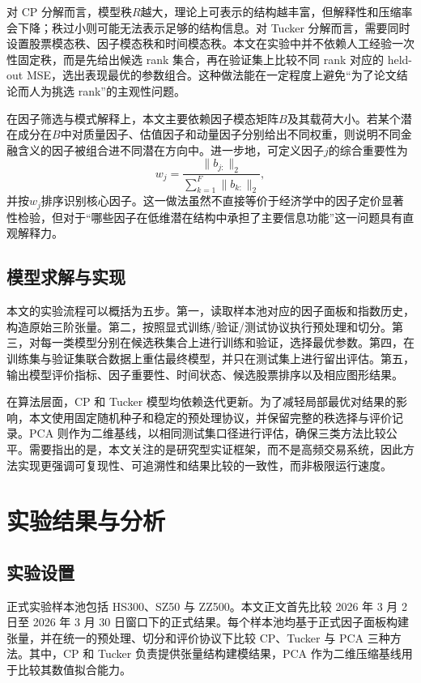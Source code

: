 对 CP 分解而言，模型秩$R$越大，理论上可表示的结构越丰富，但解释性和压缩率会下降；秩过小则可能无法表示足够的结构信息。对 Tucker 分解而言，需要同时设置股票模态秩、因子模态秩和时间模态秩。本文在实验中并不依赖人工经验一次性固定秩，而是先给出候选 rank 集合，再在验证集上比较不同 rank 对应的 held-out MSE，选出表现最优的参数组合。这种做法能在一定程度上避免“为了论文结论而人为挑选 rank”的主观性问题。

在因子筛选与模式解释上，本文主要依赖因子模态矩阵$B$及其载荷大小。若某个潜在成分在$B$中对质量因子、估值因子和动量因子分别给出不同权重，则说明不同金融含义的因子被组合进不同潜在方向中。进一步地，可定义因子$j$的综合重要性为
\begin{equation}
w_j=\frac{\|b_{j:}\|_2}{\sum_{k=1}^{F}\|b_{k:}\|_2},
\end{equation}
并按$w_j$排序识别核心因子。这一做法虽然不直接等价于经济学中的因子定价显著性检验，但对于“哪些因子在低维潜在结构中承担了主要信息功能”这一问题具有直观解释力。

\section{模型求解与实现}

本文的实验流程可以概括为五步。第一，读取样本池对应的因子面板和指数历史，构造原始三阶张量。第二，按照显式训练/验证/测试协议执行预处理和切分。第三，对每一类模型分别在候选秩集合上进行训练和验证，选择最优参数。第四，在训练集与验证集联合数据上重估最终模型，并只在测试集上进行留出评估。第五，输出模型评价指标、因子重要性、时间状态、候选股票排序以及相应图形结果。

在算法层面，CP 和 Tucker 模型均依赖迭代更新。为了减轻局部最优对结果的影响，本文使用固定随机种子和稳定的预处理协议，并保留完整的秩选择与评价记录。PCA 则作为二维基线，以相同测试集口径进行评估，确保三类方法比较公平。需要指出的是，本文关注的是研究型实证框架，而不是高频交易系统，因此方法实现更强调可复现性、可追溯性和结果比较的一致性，而非极限运行速度。

\chapter{实验结果与分析}

\section{实验设置}

正式实验样本池包括 HS300、SZ50 与 ZZ500。本文正文首先比较 2026 年 3 月 2 日至 2026 年 3 月 30 日窗口下的正式结果。每个样本池均基于正式因子面板构建张量，并在统一的预处理、切分和评价协议下比较 CP、Tucker 与 PCA 三种方法。其中，CP 和 Tucker 负责提供张量结构建模结果，PCA 作为二维压缩基线用于比较其数值拟合能力。


